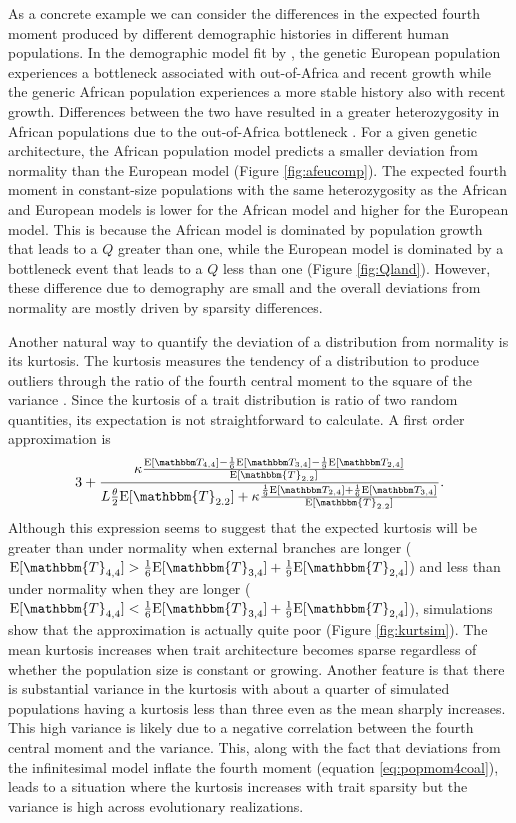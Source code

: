 As a concrete example we can consider the differences in the expected fourth
moment produced by different demographic histories in different human
populations. In the demographic model fit by \citet{Tennessen2012}, the genetic
European population experiences a bottleneck associated with out-of-Africa and
recent growth while the generic African population experiences a more stable
history also with recent growth. Differences between the two have resulted in a
greater heterozygosity in African populations due to the out-of-Africa
bottleneck \citep{Yu2002}. For a given genetic architecture, the African
population model predicts a smaller deviation from normality than the European
model (Figure \ref{fig:afeucomp}). The expected fourth moment in constant-size
populations with the same heterozygosity as the African and European models is
lower for the African model and higher for the European model. This is because
the African model is dominated by population growth that leads to a $Q$ greater
than one, while the European model is dominated by a bottleneck event that leads
to a $Q$ less than one (Figure \ref{fig:Qland}). However, these difference due
to demography are small and the overall deviations from normality are mostly
driven by sparsity differences.

Another natural way to quantify the deviation of a distribution from normality
is its kurtosis. The kurtosis measures the tendency of a distribution to produce
outliers through the ratio of the fourth central moment to the square of the
variance \citep{Westfall2014}. Since the kurtosis of a trait distribution is
ratio of two random quantities, its expectation is not straightforward to
calculate. A first order approximation is
\begin{equation}
3 + \frac{\kappa \frac{\CCC}{\E[\mathbbm{T}_{2.2}]}} {L \T \E[\mathbbm{T}_{2.2}]
    + \kappa \frac{\BBB}{\E[\mathbbm{T}_{2.2}]}}.
    \label{eq:firstord}
\end{equation}
Although this expression seems to suggest that the expected kurtosis will be
greater than under normality when external branches are longer ($\E[\mathbbm{T}_{4,4}] >
\frac{1}{6}\E[\mathbbm{T}_{3,4}] + \frac{1}{9}\E[\mathbbm{T}_{2,4}]$) and less than under normality
when they are longer ($\E[\mathbbm{T}_{4,4}] < \frac{1}{6}\E[\mathbbm{T}_{3,4}] +
\frac{1}{9}\E[\mathbbm{T}_{2,4}]$), simulations show that the approximation is actually
quite poor (Figure \ref{fig:kurtsim}). The mean kurtosis increases when trait
architecture becomes sparse regardless of whether the population size is
constant or growing. Another feature is that there is substantial variance in
the kurtosis with about a quarter of simulated populations having a kurtosis
less than three even as the mean sharply increases. This high variance is likely
due to a negative correlation between the fourth central moment and the
variance. This, along with the fact that deviations from the infinitesimal model
inflate the fourth moment (equation \eqref{eq:popmom4coal}), leads to a
situation where the kurtosis increases with trait sparsity but the variance is
high across evolutionary realizations.

